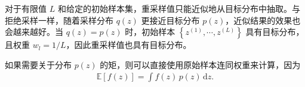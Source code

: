 \documentclass[../../main.tex]{subfiles}
\begin{document}
对于有限值 $L$ 和给定的初始样本集，重采样值只能近似地从目标分布中抽取。与拒绝采样一样，随着采样分布 $q(z)$ 更接近目标分布 $p(z)$，近似结果的效果也会越来越好。当 $q(z)=p(z)$ 时，初始样本 $\left\{z^{(1)},\cdots,z^{(L)}\right\}$ 具有目标分布，且权重 $w_{l}=1/L$，因此重采样值也具有目标分布。

如果需要关于分布 $p(z)$ 的矩，则可以直接使用原始样本连同权重来计算，因为
\begin{align}
\mathbb{E}[f(z)]=\int f(z)\,p(z)\,\mathrm{d}z.
\label{align:ch14-重采样矩}
\end{align}
\end{document}
